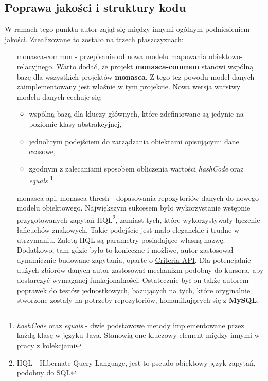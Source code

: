     \subsection{Poprawa jakości i struktury kodu}
    W ramach tego punktu autor zajął się między innymi ogólnym podniesieniem jakości. Zrealizowane to zostało
    na trzech płaszczyznach:
    \begin{itemize}
        \item[monasca-common] - 
        przepisanie od nowa modelu mapowania obiektowo-relacyjnego. Warto dodać, że projekt \textbf{monasca-common} stanowi
        wspólną bazę dla wszystkich projektów \textbf{monasca}. Z tego też powodu model danych zaimplementowany jest
        właśnie w tym projekcie. Nowa wersja warstwy modelu danych cechuje się:
        \begin{itemize}
            \item wspólną bazą dla kluczy głównych, które zdefiniowane są jedynie na poziomie klasy abstrakcyjnej,
            \item jednolitym podejściem do zarządzania obiektami opisującymi dane czasowe,
            \item zgodnym z zalecaniami sposobem obliczenia wartości \textit{hashCode} oraz \textit{equals}
            \footnote{\textit{hashCode} oraz \textit{equals} - dwie podstawowe metody implementowane przez każdą klasę w języku Java. Stanowią one
                kluczowy element między innymi w pracy z kolekcjami}
        \end{itemize}
        \item[monasca-api, monasca-thresh] - 
        dopasowania repozytoriów danych do nowego modelu obiektowego. Największym sukcesem było
        wykorzystanie wstępnie przygotowanych zapytań HQL\footnote{HQL - Hibernate Query Language, jest to
            pseudo obiektowy język zapytań, podobny do SQL}, zamiast tych, które wykorzystywały łączenie
        łańcuchów znakowych. Takie podejście jest mało eleganckie i trudne w utrzymaniu. Zaletą HQL są
        parametry posiadające własną nazwę. Dodatkowo, tam gdzie było to konieczne i możliwe, autor
        zastosował dynamicznie budowane zapytania, oparte o 
        \href{https://docs.jboss.org/hibernate/orm/5.0/devguide/en-US/html_single/#d5e3489}{Criteria API}.
        Dla potencjalnie dużych zbiorów danych autor zastosował mechanizm podobny do kursora, aby
        dostarczyć wymaganej funkcjonalności. Ostatecznie był on także autorem poprawek do testów jednostkowych,
        bazujących na tych, które oryginalnie stworzone zostały na potrzeby repozytoriów, komunikujących się
        z \textbf{MySQL}.
    \end{itemize}
    
